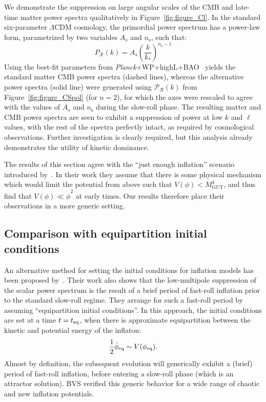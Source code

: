 We demonstrate the suppression on large angular scales of the CMB and late-time matter power spectra qualitatively in Figure~\ref{fig:figure_Cl}.  In the standard six-parameter \(\Lambda\)CDM cosmology, the primordial power spectrum has a power-law form, parametrized by two variables \(A_s\) and \(n_\mathrm{s}\), such that:
%
\begin{equation}
  P_\mathcal{R}(k) = A_s{\left(\frac{k}{k_*}\right)}^{n_\mathrm{s}-1}
\end{equation}
%
Using the best-fit parameters from {\em Planck\/}+WP+highL+BAO~\citep{planck_collaboration_planck_2013} yields the standard matter CMB power spectra (dashed lines), whereas the alternative power spectra (solid line) were generated using \(\mathcal{P}_\mathcal{R}(k)\) from Figure~\ref{fig:figure_CSpol} (for \(n=2\)), for which the axes were rescaled to agree with the values of \(A_s\) and \(n_\mathrm{s}\) during the slow-roll phase. The resulting matter and CMB power spectra are seen to exhibit a suppression of power at low \(k\) and \(\ell\) values, with the rest of the spectra perfectly intact, as required by cosmological observations.  Further investigation is clearly required, but this analysis already demonstrates the utility of kinetic dominance.

The results of this section agree with the ``just enough inflation'' scenario introduced by~\cite{Ramirez_excluded_2009,Ramirez_predictions_2012,Ramirez_low_2012}.  In their work they assume that there is some physical mechanism which would limit the potential from above such that \(V(\phi)<M_\mathrm{GUT}^4\), and thus find that \(V(\phi)\ll\dot{\phi}^2\) at early times. Our results therefore place their observations in a more generic setting.


\subsection{Comparison with equipartition initial conditions}
\label{sec:comparison}

An alternative method for setting the initial conditions for inflation models has been proposed by~\cite{boyanovsky_cmb_2006}. Their work also shows that the low-multipole suppression of the scalar power spectrum is the result of a brief period of fast-roll inflation prior to the standard slow-roll regime. They arrange for such a fast-roll period by assuming ``equipartition initial conditions''. In this approach, the initial conditions are set at a time \(t=t_{\mathrm{eq}}\), when there is approximate equipartition between the kinetic and potential energy of the inflaton:
%
\begin{equation}
  \frac{1}{2}\dot{\phi}_{\mathrm{eq}} \sim V(\phi_{\mathrm{eq}}).
  \label{eqn:bvsbc}
\end{equation}
%
Almost by definition, the subsequent evolution will generically exhibit a (brief) period of fast-roll inflation, before entering a slow-roll phase (which is an attractor solution). BVS verified this generic behavior for a wide range of chaotic and new inflation potentials.

